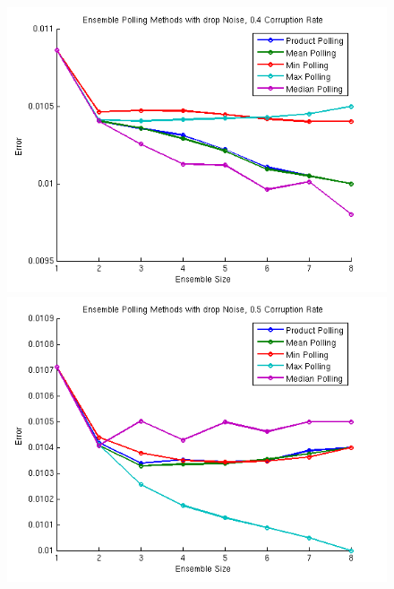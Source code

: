 \documentclass{article} %
\begin{document}
\begin{figure}[ht] 
  \label{fig:PollingMethods1} 
  \begin{minipage}[b]{0.5\linewidth}
    \centering
    \includegraphics[width=\linewidth]{methods8} 
    \vspace{4ex}
  \end{minipage}%
  \begin{minipage}[b]{0.5\linewidth}
    \centering
    \includegraphics[width=\linewidth]{methods7} 
    \vspace{4ex}
  \end{minipage} 
  \begin{minipage}[b]{0.5\linewidth}

\end{minipage}
\end{figure}
\end{document}
